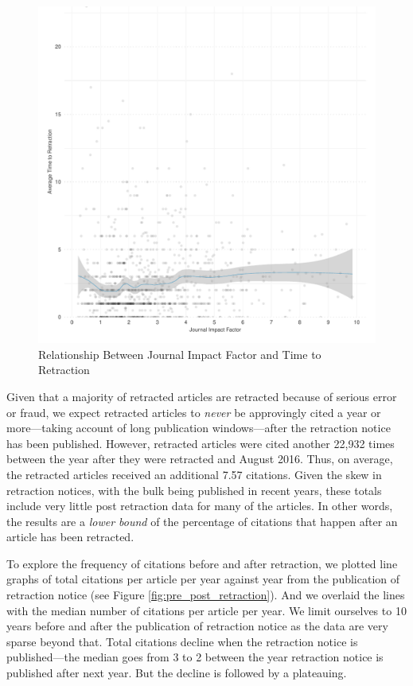 \documentclass[12pt, letterpaper]{article}
\begin{document}
\begin{figure}[H]
\centering
\includegraphics[scale=.7]{../figs/jif_time_to_retraction.pdf}
\caption{Relationship Between Journal Impact Factor and Time to Retraction}
\label{fig:jif_ttr}
\end{figure}

Given that a majority of retracted articles are retracted because of serious error or fraud, we expect retracted articles to \textit{never} be approvingly cited a year or more---taking account of long publication windows---after the retraction notice has been published. However, retracted articles were cited another 22,932 times between the year after they were retracted and August 2016. Thus, on average, the retracted articles received an additional 7.57 citations. Given the skew in retraction notices, with the bulk being published in recent years, these totals include very little post retraction data for many of the articles. In other words, the results are a \textit{lower bound} of the percentage of citations that happen after an article has been retracted.

To explore the frequency of citations before and after retraction, we plotted line graphs of total citations per article per year against year from the publication of retraction notice (see Figure \ref{fig:pre_post_retraction}). And we overlaid the lines with the median number of citations per article per year. We limit ourselves to 10 years before and after the publication of retraction notice as the data are very sparse beyond that. Total citations decline when the retraction notice is published---the median goes from 3 to 2 between the year retraction notice is published after next year. But the decline is followed by a plateauing.
\end{document}
